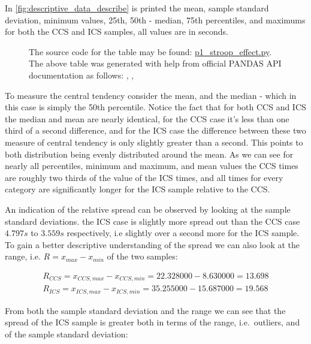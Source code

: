 \documentclass{article}
\begin{document}
In \autoref{fig:descriptive_data_describe} is printed the mean, sample standard deviation, minimum values,
25th, 50th - median, 75th percentiles, and maximums for both the CCS
and ICS samples, all values are in seconds. 
\begin{figure}[ht]
  \centering
  
  \caption{The source code for the table may be found:
    \href{https://github.com/8leggedunicorn/p1_stroop_effect/blob/master/p1_stroop_effect.py\#L1-L13}
        {p1\_stroop\_effect.py}.
      The above table was generated with help from official PANDAS API
      documentation as follows:
    \cite{PANDAS-csv}, \cite{PANDAS-to-latex}, \cite{PANDAS-describe-df}}
  \label{fig:descriptive_data_describe}
\end{figure}
\begin{center}
\end{center}
To measure the central tendency consider the mean, and the median - which in this
case is simply the 50th percentile. Notice the fact that for both CCS and ICS
the median and mean are nearly identical, for the CCS case it's less than one
third of a second difference, and for the ICS case the difference between these
two measure of central tendency is only slightly greater than a second. This
points to both distribution being evenly distributed around the mean. As we can
see for nearly all percentiles, minimum and maximum, and mean values the CCS
times are roughly two thirds of the value of the ICS times, and all times for
every category are significantly longer for the ICS sample relative to the CCS.

An indication of the relative spread can be observed by looking at the sample
standard deviations. the ICS case is slightly more spread out than the CCS case
\(4.797s\) to \(3.559s\) respectively, i.e slightly over a second more for the
ICS sample. To gain a better descriptive understanding of the spread we can also
look at the range, i.e.  \(R = x_{max} - x_{min}\) of the two samples:

\begin{align*}
R_{CCS} = x_{CCS,max} - x_{CCS,min} = 22.328000 - 8.630000 = 13.698\\
R_{ICS} = x_{ICS,max} - x_{ICS,min} = 35.255000 - 15.687000 = 19.568
\end{align*}

From both the sample standard deviation and the range we can see that the spread
of the ICS sample is greater both in terms of the range, i.e.~outliers, and of
the sample standard deviation:
\end{document}
